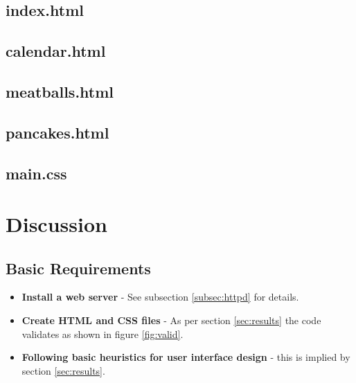 \documentclass[a4paper]{scrartcl}
\begin{document}
\subsection{index.html}


\subsection{calendar.html}


\subsection{meatballs.html}


\subsection{pancakes.html}


\subsection{main.css}


\section{Discussion}

\subsection{Basic Requirements}
\begin{itemize}
\item \textbf{Install a web server} - See subsection \ref{subsec:httpd} for details.
\item \textbf{Create HTML and CSS files} - As per section \ref{sec:results} the code validates as shown in figure \ref{fig:valid}.
\item \textbf{Following basic heuristics for user interface design} - this is implied by section \ref{sec:results}.
\end{itemize}
\end{document}

